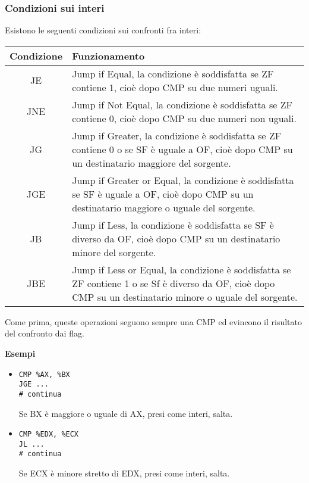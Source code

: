 \documentclass[a4paper,11pt]{article}
\begin{document}
\subsubsection{Condizioni sui interi}
Esistono le seguenti condizioni sui confronti fra interi:

\begin{table}[h!]
	\center {}
	\begin{tabular} { c  p{10cm} }
		\bfseries Condizione & \bfseries Funzionamento \\
		\hline 
		JE & Jump if Equal, la condizione è soddisfatta se ZF contiene 1, cioè dopo CMP su due numeri uguali. \\
		JNE & Jump if Not Equal, la condizione è soddisfatta se ZF contiene 0, cioè dopo CMP su due numeri non uguali. \\ 
		JG & Jump if Greater, la condizione è soddisfatta se ZF contiene 0 o se SF è uguale a OF, cioè dopo CMP su un destinatario maggiore del sorgente. \\
		JGE & Jump if Greater or Equal, la condizione è soddisfatta se SF è uguale a OF, cioè dopo CMP su un destinatario maggiore o uguale del sorgente. \\ 
		JB & Jump if Less, la condizione è soddisfatta se SF è diverso da OF, cioè dopo CMP su un destinatario minore del sorgente. \\
		JBE & Jump if Less or Equal, la condizione è soddisfatta se ZF contiene 1 o se Sf è diverso da OF, cioè dopo CMP su un destinatario minore o uguale del sorgente. \\ 
	\end{tabular}
\end{table}

Come prima, queste operazioni seguono sempre una CMP ed evincono il risultato del confronto dai flag.

\par\medskip
\noindent
\textbf{\textsf{Esempi}} \\
\begin{itemize}
	\item 
\begin{lstlisting}[language=assembler,style=codestyle]	
CMP %AX, %BX
JGE ...
# continua
\end{lstlisting}
Se BX è maggiore o uguale di AX, presi come interi, salta.

	\item 
\begin{lstlisting}[language=assembler,style=codestyle]	
CMP %EDX, %ECX
JL ...
# continua
\end{lstlisting}
Se ECX è minore stretto di EDX, presi come interi, salta.
\end{itemize}
\end{document}
